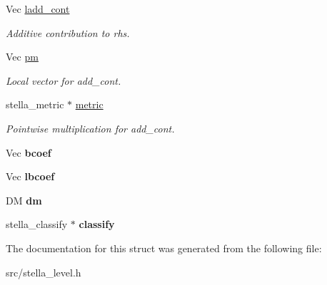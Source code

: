 \begin{DoxyCompactItemize}
Vec \mbox{\hyperlink{structstella__level_ab0497b48a8d021c80b5ed9edede17762}{ladd\+\_\+cont}}
\begin{DoxyCompactList}\small\item\em Additive contribution to rhs. \end{DoxyCompactList}\item 
\mbox{\label{structstella__level_a7d96ccadbcc7b34ba474a9c4780c30b6}} 
Vec \mbox{\hyperlink{structstella__level_a7d96ccadbcc7b34ba474a9c4780c30b6}{pm}}
\begin{DoxyCompactList}\small\item\em Local vector for add\+\_\+cont. \end{DoxyCompactList}\item 
\mbox{\label{structstella__level_a1f62922769745e8512f979a0ba07cb78}} 
stella\+\_\+metric $\ast$ \mbox{\hyperlink{structstella__level_a1f62922769745e8512f979a0ba07cb78}{metric}}
\begin{DoxyCompactList}\small\item\em Pointwise multiplication for add\+\_\+cont. \end{DoxyCompactList}\item 
\mbox{\label{structstella__level_a99de7f87e37f52459cf6619b5b1cf535}} 
Vec {\bfseries bcoef}
\item 
\mbox{\label{structstella__level_af5e51a3c9dde9e9c983946805455e406}} 
Vec {\bfseries lbcoef}
\item 
\mbox{\label{structstella__level_a1b9399c925bd7b0caf73ee0f9482f3bb}} 
DM {\bfseries dm}
\item 
\mbox{\label{structstella__level_aea2d682cb3104231ff9bfb9d25759df5}} 
stella\+\_\+classify $\ast$ {\bfseries classify}
\end{DoxyCompactItemize}


The documentation for this struct was generated from the following file\+:\begin{DoxyCompactItemize}
\item 
src/stella\+\_\+level.\+h\end{DoxyCompactItemize}
